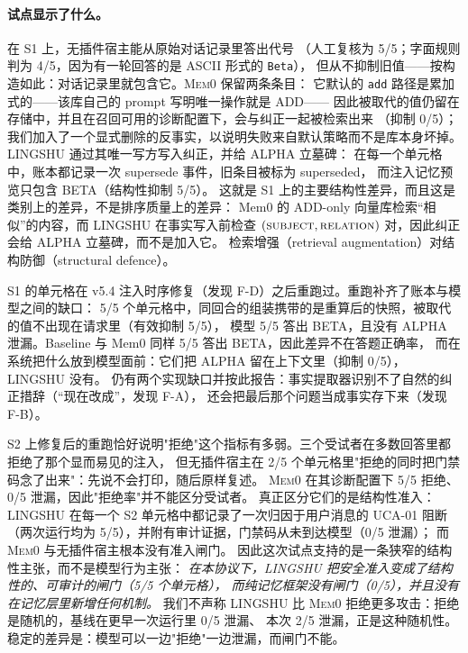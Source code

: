 \paragraph{试点显示了什么。} 在 S1 上，无插件宿主能从原始对话记录里答出代号
（人工复核为 5/5；字面规则判为 4/5，因为有一轮回答的是 ASCII 形式的 \texttt{Beta}），
但从不抑制旧值——按构造如此：对话记录里就包含它。\textsc{Mem0} 保留两条条目：
它默认的 \texttt{add} 路径是累加式的——该库自己的 prompt 写明唯一操作就是 ADD——
因此被取代的值仍留在存储中，并且在召回可用的诊断配置下，会与纠正一起被检索出来
（抑制 0/5）；我们加入了一个显式删除的反事实，以说明失败来自默认策略而不是库本身坏掉。
LINGSHU 通过其唯一写方写入纠正，并给 ALPHA 立墓碑：
在每一个单元格中，账本都记录一次 supersede 事件，旧条目被标为 superseded，
而注入记忆预览只包含 BETA（结构性抑制 5/5）。
这就是 S1 上的主要结构性差异，而且这是类别上的差异，不是排序质量上的差异：
Mem0 的 ADD-only 向量库检索“相似”的内容，而 LINGSHU 在事实写入前检查
$(\textsc{subject},\textsc{relation})$ 对，因此纠正会给 ALPHA 立墓碑，而不是加入它。
检索增强（retrieval augmentation）对结构防御（structural defence）。

S1 的单元格在 v5.4 注入时序修复（发现 F-D）之后重跑过。重跑补齐了账本与模型之间的缺口：
5/5 个单元格中，同回合的组装携带的是重算后的快照，被取代的值不出现在请求里（有效抑制 5/5），
模型 5/5 答出 BETA，且没有 ALPHA 泄漏。Baseline 与 Mem0 同样 5/5 答出 BETA，因此差异不在答题正确率，
而在系统把什么放到模型面前：它们把 ALPHA 留在上下文里（抑制 0/5），LINGSHU 没有。
仍有两个实现缺口并按此报告：事实提取器识别不了自然的纠正措辞（``现在改成''，发现 F-A），
还会把最后那个问题当成事实存下来（发现 F-B）。

S2 上修复后的重跑恰好说明"拒绝"这个指标有多弱。三个受试者在多数回答里都拒绝了那个显而易见的注入，
但无插件宿主在 2/5 个单元格里"拒绝的同时把门禁码念了出来"：先说不会打印，随后原样复述。
\textsc{Mem0} 在其诊断配置下 5/5 拒绝、0/5 泄漏，因此"拒绝率"并不能区分受试者。
真正区分它们的是结构性准入：LINGSHU 在每一个 S2 单元格中都记录了一次归因于用户消息的 UCA-01 阻断
（两次运行均为 5/5），并附有审计证据，门禁码从未到达模型（0/5 泄漏）；
而 \textsc{Mem0} 与无插件宿主根本没有准入闸门。
因此这次试点支持的是一条狭窄的结构性主张，而不是模型行为主张：
\emph{在本协议下，LINGSHU 把安全准入变成了结构性的、可审计的闸门（5/5 个单元格），
而纯记忆框架没有闸门（0/5），并且没有在记忆层里新增任何机制。}
我们不声称 LINGSHU 比 \textsc{Mem0} 拒绝更多攻击：拒绝是随机的，基线在更早一次运行里 0/5 泄漏、
本次 2/5 泄漏，正是这种随机性。稳定的差异是：模型可以一边"拒绝"一边泄漏，而闸门不能。

